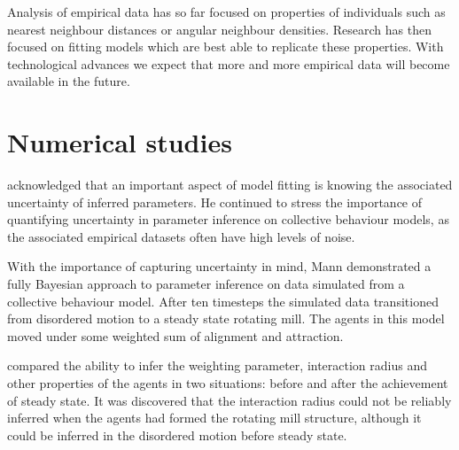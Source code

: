 Analysis of empirical data has so far focused on properties of individuals such as nearest neighbour distances or angular neighbour densities. Research has then focused on fitting models which are best able to replicate these properties. With technological advances we expect that more and more empirical data will become available in the future.

\section{Numerical studies}
\label{sec:numerical_studies}

\citet{mann11} acknowledged that an important aspect of model fitting is knowing the associated uncertainty of inferred parameters. He continued to stress the importance of quantifying uncertainty in parameter inference on collective behaviour models, as the associated empirical datasets often have high levels of noise.

With the importance of capturing uncertainty in mind, Mann demonstrated a fully Bayesian approach to parameter inference on data simulated from a collective behaviour model. After ten timesteps the simulated data transitioned from disordered motion to a steady state rotating mill. The agents in this model moved under some weighted sum of alignment and attraction.

\citet{mann11} compared the ability to infer the weighting parameter, interaction radius and other properties of the agents in two situations: before and after the achievement of steady state. It was discovered that the interaction radius could not be reliably inferred when the agents had formed the rotating mill structure, although it could be inferred in the disordered motion before steady state. 

